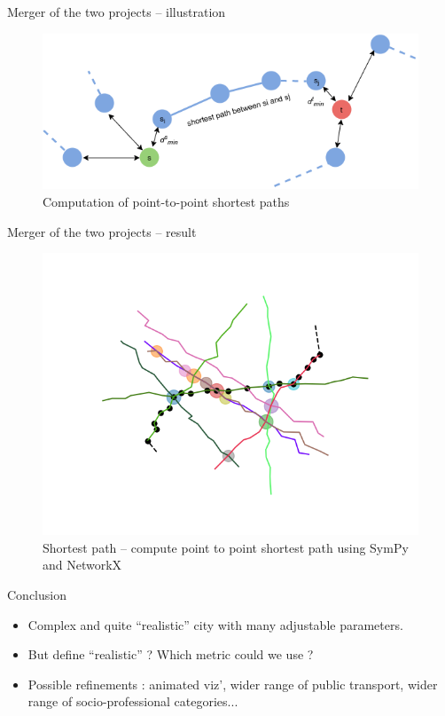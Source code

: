 \begin{frame}{Merger of the two projects -- illustration}
	\begin{figure}
		\centering
		\includegraphics[width=\linewidth]{images/shortest_path.png}
		\caption{Computation of point-to-point shortest paths}
	\end{figure}
\end{frame}
\begin{frame}{Merger of the two projects -- result}
	\begin{figure}
		\centering
		\includegraphics[width=0.7\linewidth]{images/net_8.png}
		\caption{Shortest path -- compute point to point shortest path using SymPy and NetworkX}
	\end{figure}
\end{frame}
\begin{frame}{Conclusion}
	\begin{itemize}
		\item Complex and quite ``realistic'' city with many adjustable parameters.
		\item But define ``realistic'' ? Which metric could we use ?
		\item Possible refinements : animated viz', wider range of public transport, wider range of socio-professional categories...
	\end{itemize}
	
\end{frame}